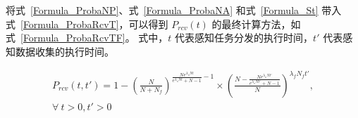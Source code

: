 将式~\eqref{Formula_ProbaNP}、式~\eqref{Formula_ProbaNA} 和式~\eqref{Formula_St} 带入式~\eqref{Formula_ProbaRcvT}，可以得到 $P_{rcv}(t)$ 的最终计算方法，如式~\eqref{Formula_ProbaRcvTF}。
式中，$t$ 代表感知任务分发的执行时间，$t'$ 代表感知数据收集的执行时间。

\begin{equation}
  \label{Formula_ProbaRcvTF}
  \begin{gathered}
    P_{rcv}(t, t') = 1 -  (\frac{N}{N + N_f})^{\frac{N e^{\lambda_n N t}}{e^{\lambda_n N t} + N -1} - 1} \times (\frac{N-\frac{N e^{\lambda_n N t'}}{e^{\lambda_n N t'} + N -1}}{N})^{\lambda_f N_f t'}, \\
    \forall \  t > 0, t' >0
  \end{gathered}
\end{equation}






